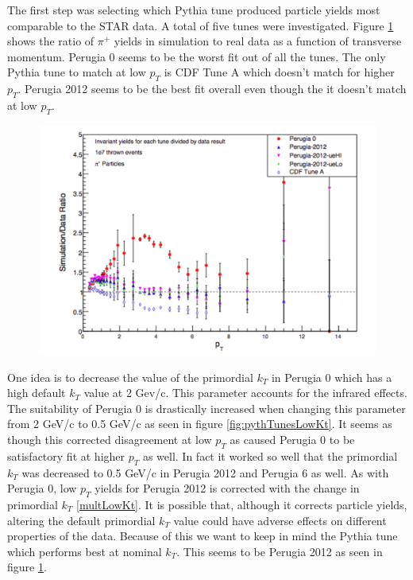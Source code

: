 \documentclass[abstract = on,listof=totoc, bibliography=totoc]{scrreprt}
\begin{document}
The first step was selecting which Pythia tune produced particle yields most comparable to the STAR data. A total of five tunes were investigated. Figure \ref{fig:piPlusPythTunes} shows the ratio of $\pi^+$ yields in simulation to real data as a function of transverse momentum. Perugia 0 seems to be the worst fit out of all the tunes. The only Pythia tune to match at low $p_T$ is CDF Tune A which doesn't match for higher $p_T$. Perugia 2012 seems to be the  best fit overall even though the it doesn't match at low $p_T$. 

\begin{figure}
\begin{center}
\includegraphics[width = 1\textwidth]{piPlusPythTunes}
\caption[]{}
\label{fig:piPlusPythTunes}
\end{center}
\end{figure}

One idea is to decrease the value of the primordial $k_T$ in Perugia 0 which has a high default $k_T$ value at 2 Gev/c. This parameter accounts for the infrared effects.\cite{pythTunes} The suitability of Perugia 0 is drastically increased when changing this parameter from 2 GeV/c to 0.5 GeV/c as seen in figure \ref{fig:pythTunesLowKt}. It seems as though this corrected disagreement at low $p_T$ as caused Perugia 0 to be satisfactory fit at higher $p_T$ as well. In fact it worked so well that the primordial $k_T$ was decreased to 0.5 GeV/c in Perugia 2012 and Perugia 6 as well. As with Perugia 0, low $p_T$ yields for Perugia 2012 is corrected with the change in primordial $k_T$ \ref{multLowKt}. It is possible that, although it corrects particle yields, altering the default primordial $k_T$ value could have adverse effects on different properties of the data. Because of this we want to keep in mind the Pythia tune which performs best at nominal $k_T$. This seems to be Perugia 2012 as seen in figure \ref{fig:piPlusPythTunes}.
\end{document}

